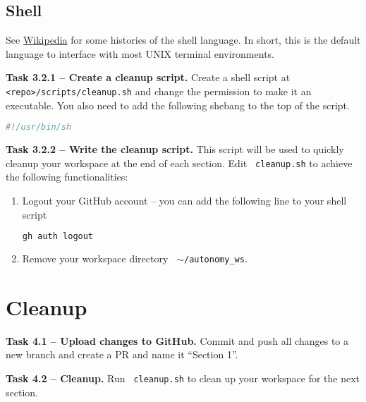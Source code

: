 \documentclass{article}
\def\code#1{\texttt{\color{magenta} #1}}
\begin{document}
\subsection{Shell}\label{sec:shell}
See \href{https://en.wikipedia.org/wiki/Shell_script}{Wikipedia} for some histories
of the shell language. In short, this is the default language to interface with most
UNIX terminal environments.

{\bf Task 3.2.1 -- Create a cleanup script.} Create a shell script at
\code{<repo>/scripts/cleanup.sh} and change the permission to make it an executable.
You also need to add the following shebang to the top of the script.
\begin{lstlisting}[language=sh, numbers=none]
#!/usr/bin/sh
\end{lstlisting}

{\bf Task 3.2.2 -- Write the cleanup script.} This script will be used to quickly cleanup
your workspace at the end of each section. Edit \code{cleanup.sh} to achieve
the following functionalities:

\begin{enumerate}
\item Logout your GitHub account -- you can add the following line to your shell script
\begin{lstlisting}[language=sh, numbers=none]
gh auth logout
\end{lstlisting}

\item Remove your workspace directory \code{$\sim$/autonomy\_ws}.
\end{enumerate}

\section{Cleanup}

{\bf Task 4.1 -- Upload changes to GitHub.} Commit and push all changes to a new branch
and create a PR and name it ``Section 1''.

{\bf Task 4.2 -- Cleanup.} Run \code{cleanup.sh} to clean up
your workspace for the next section.
\end{document}
